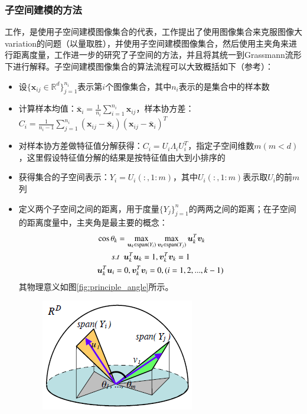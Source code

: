 \subsubsection{子空间建模的方法}
\label{sec:current_SubMan_Subspace}
工作\cite{Subspace_MSM}，\cite{Subspace_GDA}是使用子空间建模图像集合的代表，工作\cite{Subspace_MSM}提出了使用图像集合来克服图像大variation的问题（以量取胜），并使用子空间建模图像集合，然后使用主夹角来进行距离度量，工作\cite{Subspace_GDA}进一步的研究了子空间的方法，并且将其统一到Grassmann流形下进行解释。子空间建模图像集合的算法流程可以大致概括如下（参考\cite{Subspace_GDA}）：
\begin{itemize}
\item 设$\{\bm{x}_{ij} \in \mathbb{R}^{d}\}_{j=1}^{n_i}$表示第$i$个图像集合，其中$n_i$表示的是集合中的样本数
\item 计算样本均值：$\bar{\bm{x}}_i=\frac{1}{n_i}\sum_{i=1}^{n_i} \bm{x}_{ij}$，样本协方差：$C_i=\frac{1}{n_i-1}\sum_{j=1}^{n_i}(\bm{x}_{ij}-\bar{\bm{x}}_i)(\bm{x}_{ij}-\bar{\bm{x}}_i)^{T}$
\item 对样本协方差做特征值分解获得：$C_i=U_i\Lambda_iU_{i}^{T}$，指定子空间维数$m(m<d)$，这里假设特征值分解的结果是按特征值由大到小排序的
\item 获得集合的子空间表示：$Y_i=U_i(:,1:m)$，其中$U_i(:,1:m)$表示取$U_i$的前$m$列
\item 定义两个子空间之间的距离，用于度量$\{Y_j\}_{j=1}^n$的两两之间的距离；在子空间的距离度量中，主夹角是最主要的概念：
\begin{equation}
\label{principal_angle}
\begin{split}
&\cos \theta_{k}=\max_{\bm{u}_k \in {\rm span}(Y_i)}\max_{\bm{v}_k \in {\rm span}(Y_j)} \bm{u}_{k}^{T}\bm{v}_{k}\\
&~~~~~~~s.t~~\bm{u}_{k}^{T}\bm{u}_{k}=1,\bm{v}_{k}^{T}\bm{v}_{k}=1\\
&\bm{u}_{k}^{T}\bm{u}_{i}=0,\bm{v}_{k}^{T}\bm{v}_{i}=0,(i=1,2,...,k-1)\\
\end{split}
\end{equation}
其物理意义如图\ref{fig:principle_angle}所示。
\begin{figure}[h]
	\centering
	\includegraphics[width=0.4\linewidth]{source/principal_angle.png}

\end{figure}
\end{itemize}
